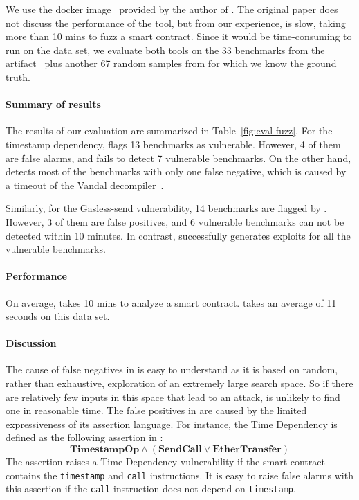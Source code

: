 We use the docker image~\cite{fuzz-docker} provided by the author of \contractfuzz.
The original paper does not discuss the performance of the tool, 
but from our experience, \contractfuzz is slow, taking more than 
10 mins to fuzz a smart contract. Since it would be time-consuming to 
run \contractfuzz on the \etherscan data set, we evaluate both tools 
on the 33 benchmarks from the \contractfuzz artifact~\cite{fuzz-data} plus another
67 random samples from \etherscan for which we know the ground truth.

\paragraph{Summary of results}
The results of our evaluation are summarized in Table~\ref{fig:eval-fuzz}.
For the timestamp dependency, \contractfuzz flags 13 benchmarks 
as vulnerable. However, 4 of them are false alarms, and \contractfuzz fails to detect 7 
vulnerable benchmarks. On the other hand, \toolname detects most of 
the benchmarks with only one false negative, which is caused by a timeout of the Vandal
decompiler~\cite{madmax}.

Similarly, for the Gasless-send vulnerability, 14 benchmarks are flagged by \contractfuzz.
However, 3 of them are false positives, and 6 vulnerable benchmarks can not be detected 
within 10 minutes. In contrast, \toolname successfully generates exploits for 
all the vulnerable benchmarks.

\paragraph{Performance}
On average, \contractfuzz takes 10 mins to analyze a smart contract. 
\toolname takes an average of 11 seconds on this data set.

\paragraph{Discussion}
The cause of false negatives in \contractfuzz is easy to understand as it is
based on random, rather than exhaustive, exploration of an extremely large
search space. So if there are relatively few inputs in this space that lead to
an attack, \contractfuzz is unlikely to find one in reasonable time. The false
positives in \contractfuzz are caused by the limited expressiveness of its
assertion language. For instance, the Time Dependency is defined as the
following assertion in \contractfuzz: 
\[
\textbf{TimestampOp} \wedge (\textbf{SendCall} \vee \textbf{EtherTransfer})
\]
The assertion raises a Time Dependency vulnerability if the smart contract
contains the \texttt{timestamp} and \texttt{call} instructions. It is
easy to raise false alarms with this assertion if the \texttt{call} instruction 
does not depend on \texttt{timestamp}. 

 \\